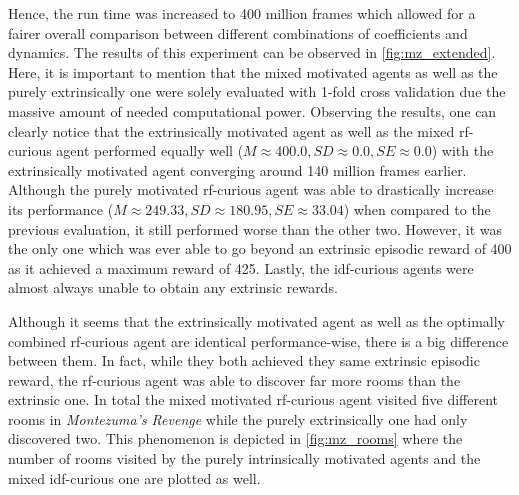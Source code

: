 \documentclass[draft,final]{vutinfth} %
\begin{document}
    Hence, the run time was increased to 400 million frames which allowed for a fairer overall comparison between different combinations of coefficients and dynamics.
    The results of this experiment can be observed in \autoref{fig:mz_extended}.
    Here, it is important to mention that the mixed motivated agents as well as the purely extrinsically one were solely evaluated with 1-fold cross validation due the massive amount of needed computational power.
    Observing the results, one can clearly notice that the extrinsically motivated agent as well as the mixed \gls{rf}-curious agent performed equally well ($M\approx400.0,SD\approx0.0,SE\approx0.0$) with the extrinsically motivated agent converging around 140 million frames earlier.
    Although the purely motivated \gls{rf}-curious agent was able to drastically increase its performance ($M\approx249.33,SD\approx180.95,SE\approx33.04$) when compared to the previous evaluation, it still performed worse than the other two.
    However, it was the only one which was ever able to go beyond an extrinsic episodic reward of 400 as it achieved a maximum reward of 425.
    Lastly, the \gls{idf}-curious agents were almost always unable to obtain any extrinsic rewards.

    Although it seems that the extrinsically motivated agent as well as the optimally combined \gls{rf}-curious agent are identical performance-wise, there is a big difference between them.
    In fact, while they both achieved they same extrinsic episodic reward, the \gls{rf}-curious agent was able to discover far more rooms than the extrinsic one.
    In total the mixed motivated \gls{rf}-curious agent visited five different rooms in \textit{Montezuma's Revenge} while the purely extrinsically one had only discovered two.
    This phenomenon is depicted in \autoref{fig:mz_rooms} where the number of rooms visited by the purely intrinsically motivated agents and the mixed \gls{idf}-curious one are plotted as well.
\end{document}
